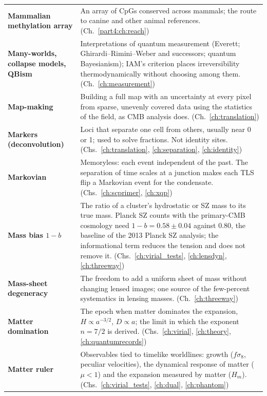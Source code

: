 {\begin{longtable}{@{}>{\raggedright\arraybackslash}p{}>{\raggedright\arraybackslash}p{}@{}}
\textbf{Mammalian methylation array} & An array of CpGs conserved across mammals; the route to canine and other animal references. {\footnotesize(Ch.~\ref{part4:ch:reach})}\\[1pt]
\textbf{Many-worlds, collapse models, QBism} & Interpretations of quantum measurement (Everett; Ghirardi--Rimini--Weber and successors; quantum Bayesianism); IAM's criterion places irreversibility thermodynamically without choosing among them. {\footnotesize(Ch.~\ref{ch:measurement})}\\[1pt]
\textbf{Map-making} & Building a full map with an uncertainty at every pixel from sparse, unevenly covered data using the statistics of the field, as CMB analysis does. {\footnotesize(Ch.~\ref{ch:translation})}\\[1pt]
\textbf{Markers (deconvolution)} & Loci that separate one cell from others, usually near 0 or 1; used to solve fractions. Not identity sites. {\footnotesize(Chs.~\ref{ch:translation}, \ref{ch:separation}, \ref{ch:identity})}\\[1pt]
\textbf{Markovian} & Memoryless: each event independent of the past. The separation of time scales at a junction makes each TLS flip a Markovian event for the condensate. {\footnotesize(Chs.~\ref{ch:scprimer}, \ref{ch:xqp})}\\[1pt]
\textbf{Mass bias $1-b$} & The ratio of a cluster's hydrostatic or SZ mass to its true mass. Planck SZ counts with the primary-CMB cosmology need $1-b=0.58\pm0.04$ against 0.80, the baseline of the 2013 Planck SZ analysis; the informational term reduces the tension and does not remove it. {\footnotesize(Chs.~\ref{ch:virial_tests}, \ref{ch:lensdyn}, \ref{ch:threeway})}\\[1pt]
\textbf{Mass-sheet degeneracy} & The freedom to add a uniform sheet of mass without changing lensed images; one source of the few-percent systematics in lensing masses. {\footnotesize(Ch.~\ref{ch:threeway})}\\[1pt]
\textbf{Matter domination} & The epoch when matter dominates the expansion, $H\propto a^{-3/2}$, $D\propto a$; the limit in which the exponent $n=7/2$ is derived. {\footnotesize(Chs.~\ref{ch:virial}, \ref{ch:theory}, \ref{ch:quantumrecords})}\\[1pt]
\textbf{Matter ruler} & Observables tied to timelike worldlines: growth ($f\sigma_8$, peculiar velocities), the dynamical response of matter ($\mu<1$) and the expansion measured by matter ($H_m$). {\footnotesize(Chs.~\ref{ch:virial_tests}, \ref{ch:dual}, \ref{ch:phantom})}\\[1pt]

\end{longtable}}
